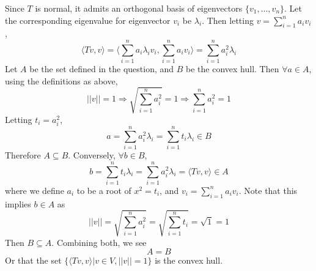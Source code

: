 \documentclass[answers]{exam}
\begin{document}
\begin{questions}
\begin{parts}
\end{parts}


\begin{solution}
	Since $T$ is normal, it admits an orthogonal basis of eigenvectors $\{v_1,\dots,v_n\}$. Let the corresponding eigenvalue for eigenvector $v_i$ be $\lambda_i$. Then letting $v = \sum_{i=1}^n a_iv_i$,
	$$\langle Tv,v \rangle = \langle \sum_{i=1}^n a_i\lambda_iv_i,\sum_{i=1}^n a_iv_i \rangle = \sum_{i=1}^n a_i^2\lambda_i$$
	Let $A$ be the set defined in the question, and $B$ be the convex hull. Then $\forall a \in A$, using the definitions as above,
	$$||v|| = 1 \Rightarrow \sqrt{\sum_{i=1}^n a_i^2} = 1 \Rightarrow \sum_{i=1}^n a_i^2 = 1$$
	Letting $t_i = a_i^2$, 
	$$a = \sum_{i=1}^n a_i^2\lambda_i = \sum_{i=1}^n t_i\lambda_i \in B$$
	Therefore $A \subseteq B$. Conversely, $\forall b \in B$,
	$$b = \sum_{i=1}^n t_i\lambda_i = \sum_{i=1}^n a_i^2\lambda_i = \langle Tv,v \rangle \in A$$
	where we define $a_i$ to be a root of $x^2 = t_i$, and $v_i = \sum_{i=1}^n a_iv_i$. Note that this implies $b \in A$ as
	$$||v|| = \sqrt{\sum_{i=1}^n a_i^2} = \sqrt{\sum_{i=1}^n t_i} = \sqrt{1} = 1$$
	Then $B \subseteq A$. Combining both, we see
	$$A = B$$
	Or that the set $\{\langle Tv,v \rangle | v \in V, ||v|| = 1\}$ is the convex hull.
\end{solution}
\end{questions}
\end{document}
